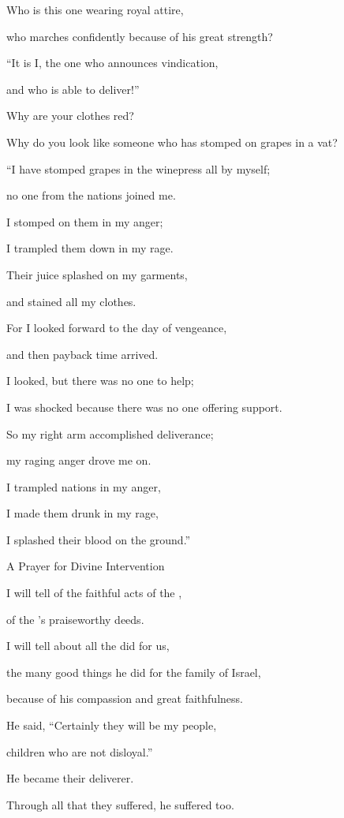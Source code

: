 {\par }{\Q Who is this one
wearing
royal attire,
\par }{\Q who marches confidently because
of his great
strength?
\par }{\Q “It is I,
the one who announces
vindication,
\par }{\Q and who is able
to deliver!”
\par }{\Q {}Why
are your clothes
red?
\par }{\Q Why do you look like someone who has stomped
on grapes in a vat?
\par }{\Q {}“I have stomped
grapes in the winepress
all by myself;
\par }{\Q no
one
from the nations
joined
me.
\par }{\Q I stomped
on them in my anger;
\par }{\Q I trampled
them down in my rage.
\par }{\Q Their juice
splashed
on
my garments,
\par }{\Q and stained
all
my clothes.
\par }{\Q {}For
I looked forward to the day
of vengeance,
\par }{\Q and then payback
time arrived.
\par }{\Q {}I looked,
but there was no
one to help;
\par }{\Q I was shocked
because there was no
one offering support.
\par }{\Q So my right arm
accomplished deliverance;
\par }{\Q my raging anger
drove me on.
\par }{\Q {}I trampled
nations
in my anger,
\par }{\Q I made them drunk
in my rage,
\par }{\Q I splashed
their blood
on the ground.”
\par }{\SH A Prayer for Divine Intervention
\par }{\Q {}I
will tell of the faithful
acts
of the {},
\par }{\Q of the {}’s praiseworthy deeds.
\par }{\Q I will tell about all the
{} did for us,
\par }{\Q the many good things he did for the family of Israel,
\par }{\Q because of his compassion and great faithfulness.
\par }{\Q {}He said,
“Certainly
they will be my people,
\par }{\Q children
who are
not
disloyal.”
\par }{\Q He became their
deliverer.
\par }{\Q {}Through
all
that they suffered,
he suffered
too.

}
